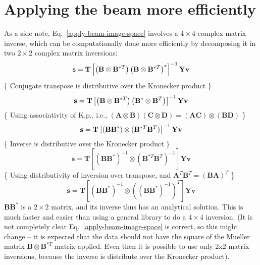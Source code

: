 \documentclass[a4paper,11pt]{article}
\begin{document}
\section{Applying the beam more efficiently}
As a side note, Eq.~\eqref{apply-beam-image-space} involves a $4\times 4$ complex matrix inverse, which can be computationally done more efficiently by decomposing it in two $2\times 2$ complex matrix inversions:
\begin{equation} \notag
 \textbf{s} =
\mathbf{T} \left[ \left(\mathbf{B} \otimes \mathbf{B}^{*T} \right) \left(\mathbf{B} \otimes \mathbf{B}^{*T} \right)^*\right]^{-1} \mathbf{Y} \textbf{v}
\end{equation}
\{ Conjugate transpose is distributive over the Kronecker product  \}
\begin{equation} \notag
 \textbf{s} =
\mathbf{T} \left[ \left(\mathbf{B} \otimes \mathbf{B}^{*T} \right) \left(\mathbf{B}^{*} \otimes \mathbf{B}^T \right)\right]^{-1} \mathbf{Y} \textbf{v}
\end{equation}
\{ Using associativity of K.p., i.e., $\left(\mathbf{A} \otimes \mathbf{B} \right) \left(\mathbf{C} \otimes \mathbf{D} \right) = (\mathbf{AC}) \otimes (\mathbf{BD})$ \}
\begin{equation} \notag
 \textbf{s} = \mathbf{T} \left[ (\mathbf{BB}^*) \otimes (\mathbf{B}^{*T}\mathbf{B}^T) \right]^{-1} \mathbf{Y} \textbf{v}
\end{equation}
\{ Inverse is distributive over the Kronecker product \}
\begin{equation}
 \textbf{s} = \mathbf{T} \left[ (\mathbf{BB}^*)^{-1} \otimes (\mathbf{B}^{*T}\mathbf{B}^T)^{-1} \right] \mathbf{Y} \textbf{v}
\end{equation}
\{ Using distributivity of inversion over transpose, and $\mathbf{A}^T \mathbf{B}^T=(\mathbf{BA})^T$ \}
\begin{equation}
 \textbf{s} = \mathbf{T} \left[ (\mathbf{BB}^*)^{-1} \otimes \left((\mathbf{B}\mathbf{B}^*)^{-1}\right)^T \right] \mathbf{Y} \textbf{v}
\end{equation}
$\mathbf{BB}^*$ is a $2\times 2$ matrix, and its inverse thus has an analytical solution. This is much faster and easier than using a general library to do a $4 \times 4$ inversion. (It is not completely clear Eq.~\ref{apply-beam-image-space} is correct, so this might change -- it is expected that the data should not have the square of the Mueller matrix $\mathbf{B}\otimes\mathbf{B}^{*T}$ matrix applied. Even then it is possible to use only 2x2 matrix inversions, because the inverse is distribute over the Kronecker product).
\label{lastpage}
\end{document}
